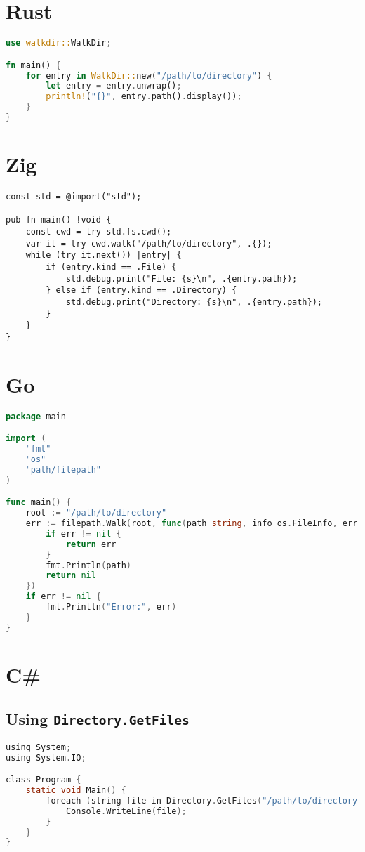 \documentclass{article}
\begin{document}
\section{Rust}
\begin{lstlisting}[language=Rust]
use walkdir::WalkDir;

fn main() {
    for entry in WalkDir::new("/path/to/directory") {
        let entry = entry.unwrap();
        println!("{}", entry.path().display());
    }
}
\end{lstlisting}

\section{Zig}
\begin{lstlisting}
const std = @import("std");

pub fn main() !void {
    const cwd = try std.fs.cwd();
    var it = try cwd.walk("/path/to/directory", .{});
    while (try it.next()) |entry| {
        if (entry.kind == .File) {
            std.debug.print("File: {s}\n", .{entry.path});
        } else if (entry.kind == .Directory) {
            std.debug.print("Directory: {s}\n", .{entry.path});
        }
    }
}
\end{lstlisting}

\section{Go}
\begin{lstlisting}[language=Go]
package main

import (
	"fmt"
	"os"
	"path/filepath"
)

func main() {
	root := "/path/to/directory"
	err := filepath.Walk(root, func(path string, info os.FileInfo, err error) error {
		if err != nil {
			return err
		}
		fmt.Println(path)
		return nil
	})
	if err != nil {
		fmt.Println("Error:", err)
	}
}
\end{lstlisting}

\section{C\#}
\subsection{Using \texttt{Directory.GetFiles}}
\begin{lstlisting}[language=C]
using System;
using System.IO;

class Program {
    static void Main() {
        foreach (string file in Directory.GetFiles("/path/to/directory", "*", SearchOption.AllDirectories)) {
            Console.WriteLine(file);
        }
    }
}
\end{lstlisting}
\end{document}
